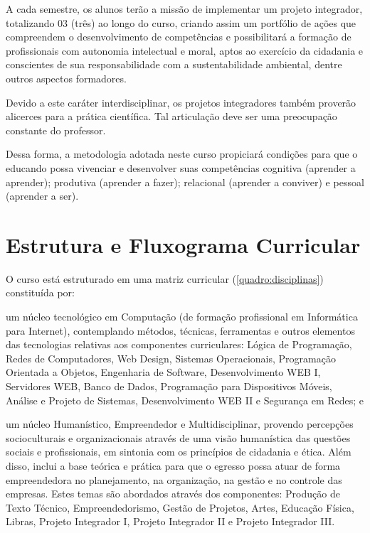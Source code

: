 \documentclass[
	12pt,				%
	openright,			%
	twoside,			%
	a4paper,			%
	chapter=TITLE,		%
	english,			%
	french,				%
	spanish,			%
	brazil,				%
	]{abntex2}
\begin{document}
A cada semestre, os alunos terão a missão de implementar um projeto integrador, totalizando 03 (três) ao longo do curso, criando assim um portfólio de ações que compreendem o desenvolvimento de competências e possibilitará a formação de profissionais com autonomia intelectual e moral, aptos ao exercício da cidadania e conscientes de sua responsabilidade com a sustentabilidade ambiental, dentre outros aspectos formadores. 

Devido a este caráter interdisciplinar, os projetos integradores também proverão alicerces para a prática científica. Tal articulação deve ser uma preocupação constante do professor. %


Dessa forma, a metodologia adotada neste curso propiciará condições para que o educando possa vivenciar e desenvolver suas competências cognitiva (aprender a aprender); produtiva (aprender a fazer); relacional (aprender a conviver) e pessoal (aprender a ser).



\section{Estrutura e Fluxograma Curricular} 

O curso está estruturado em uma matriz curricular (\autoref{quadro:disciplinas}) constituída por:
\begin{alineas}
	\item um núcleo tecnológico em Computação (de formação profissional em Informática para Internet), contemplando métodos, técnicas, ferramentas e outros elementos das tecnologias relativas aos componentes curriculares:  Lógica de Programação, Redes de Computadores, Web Design, Sistemas Operacionais, Programação Orientada a Objetos, Engenharia de Software, Desenvolvimento WEB I, Servidores WEB, Banco de Dados, Programação para Dispositivos Móveis, Análise e Projeto de Sistemas, Desenvolvimento WEB II e Segurança em Redes; e 
	\item um núcleo Humanístico, Empreendedor e Multidisciplinar, provendo percepções socioculturais e organizacionais através de uma visão humanística das questões sociais e profissionais, em sintonia com os princípios de cidadania e ética.  Além disso, inclui a base teórica e prática para que o egresso possa atuar de forma empreendedora no planejamento, na organização, na gestão e no controle das empresas. Estes temas são abordados através dos componentes: {Produção de Texto Técnico,  Empreendedorismo, Gestão de Projetos, Artes, Educação Física, Libras}, Projeto Integrador I, Projeto Integrador II e Projeto Integrador III.

\end{alineas}
\end{document}
